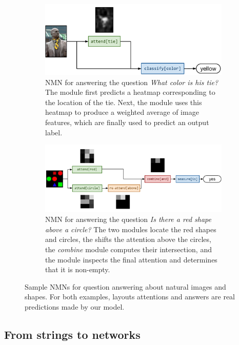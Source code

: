 \begin{figure}
  \begin{subfigure}[t]{0.4\textwidth}
    \includegraphics[width=\textwidth]{fig/full1}
    \caption{NMN for answering the question \emph{What color is
    his tie?} The  module first predicts a heatmap
    corresponding to the location of the tie. Next, the 
    module uses this heatmap to produce a weighted average of image features,
  which are finally used to predict an output label.}
  \end{subfigure}
  \hfill
  \begin{subfigure}[t]{0.55\textwidth}
    \includegraphics[width=\textwidth]{fig/full2}
    \caption{NMN for answering the question \emph{Is there a red shape above a
    circle?} The two  modules locate the red shapes and circles,
    the  shifts the attention above the circles, the
    \emph{combine} module computes their intersection, and the
     module inspects the final attention and determines
  that it is non-empty.}
  \label{fig:shape-nmn}
  \end{subfigure}
  \caption{Sample NMNs for question answering about natural images and shapes.
  For both examples, layouts attentions and answers are real predictions made by
  our model.}
  \label{fig:nmns}
\end{figure}


\subsection{From strings to networks}

